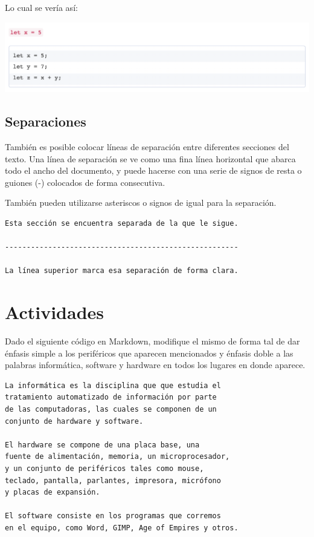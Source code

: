 Lo cual se vería así:

\includegraphics[scale=0.63]{anexos/markdown/imagenes/md_codigo.png}

\subsection*{Separaciones}

También es posible colocar líneas de separación entre diferentes secciones del
texto. Una línea de separación se ve como una fina línea horizontal que abarca
todo el ancho del documento, y puede hacerse con una serie de signos de resta o
guiones (-) colocados de forma consecutiva.

También pueden utilizarse asteriscos o signos de igual para la separación.

\begin{lstlisting}[language=Markdown]
Esta sección se encuentra separada de la que le sigue.

------------------------------------------------------

La línea superior marca esa separación de forma clara.
\end{lstlisting}


\section{Actividades}

\begin{exercise}
Dado el siguiente código en Markdown, modifique el mismo de forma tal de dar
énfasis simple a los periféricos que aparecen mencionados y énfasis doble a las
palabras informática, software y hardware en todos los lugares en donde aparece.

\begin{minipage}{0.92\textwidth}
    \begin{lstlisting}[language=Markdown]
La informática es la disciplina que que estudia el
tratamiento automatizado de información por parte
de las computadoras, las cuales se componen de un
conjunto de hardware y software.

El hardware se compone de una placa base, una
fuente de alimentación, memoria, un microprocesador,
y un conjunto de periféricos tales como mouse,
teclado, pantalla, parlantes, impresora, micrófono
y placas de expansión.

El software consiste en los programas que corremos
en el equipo, como Word, GIMP, Age of Empires y otros.
    \end{lstlisting}
\end{minipage}
\end{exercise}

